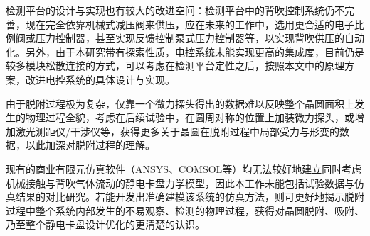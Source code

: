 检测平台的设计与实现也有较大的改进空间：检测平台中的背吹控制系统仍不完善，现在完全依靠机械式减压阀来供压，应在未来的工作中，选用更合适的电子比例阀或压力控制器，甚至实现反馈控制泵式压力控制器等，以实现背吹供压的自动化。另外，由于本研究带有探索性质，电控系统未能实现更高的集成度，目前仍是较多模块松散连接的方式，可以考虑在检测平台定性之后，按照本文中的原理方案，改进电控系统的具体设计与实现。

由于脱附过程极为复杂，仅靠一个微力探头得出的数据难以反映整个晶圆面积上发生的物理过程全貌，考虑在后续试验中，在圆周对称的位置上加装微力探头，或增加激光测距仪/干涉仪等，获得更多关于晶圆在脱附过程中局部受力与形变的数据，以此加深对脱附过程的理解。

现有的商业有限元仿真软件（ANSYS、COMSOL等）均无法较好地建立同时考虑机械接触与背吹气体流动的静电卡盘力学模型，因此本工作未能包括试验数据与仿真结果的对比研究。若能开发出准确建模该系统的仿真方法，则可更好地揭示脱附过程中整个系统内部发生的不易观察、检测的物理过程，获得对晶圆脱附、吸附、乃至整个静电卡盘设计优化的更清楚的认识。